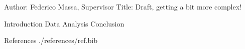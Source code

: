 
Author: Federico Massa, Supervisor
Title: Draft, getting a bit more complex!

Introduction
Data
Analysis
Conclusion

References
./references/ref.bib
